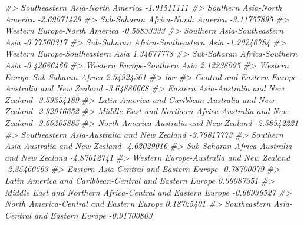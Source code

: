 \documentclass[
]{book}
\newenvironment{Shaded}{\begin{snugshade}}{\end{snugshade}}
\newcommand{\CommentTok}[1]{\textcolor[rgb]{0.56,0.35,0.01}{\textit{#1}}}
\theoremstyle{definition}
\theoremstyle{definition}
\theoremstyle{definition}
\theoremstyle{definition}
\theoremstyle{remark}
\begin{document}
\begin{Shaded}
\begin{Highlighting}[]
\CommentTok{\#\textgreater{} Southeastern Asia{-}North America                             {-}1.91511111}
\CommentTok{\#\textgreater{} Southern Asia{-}North America                                 {-}2.69071429}
\CommentTok{\#\textgreater{} Sub{-}Saharan Africa{-}North America                            {-}3.11757895}
\CommentTok{\#\textgreater{} Western Europe{-}North America                                {-}0.56833333}
\CommentTok{\#\textgreater{} Southern Asia{-}Southeastern Asia                             {-}0.77560317}
\CommentTok{\#\textgreater{} Sub{-}Saharan Africa{-}Southeastern Asia                        {-}1.20246784}
\CommentTok{\#\textgreater{} Western Europe{-}Southeastern Asia                             1.34677778}
\CommentTok{\#\textgreater{} Sub{-}Saharan Africa{-}Southern Asia                            {-}0.42686466}
\CommentTok{\#\textgreater{} Western Europe{-}Southern Asia                                 2.12238095}
\CommentTok{\#\textgreater{} Western Europe{-}Sub{-}Saharan Africa                            2.54924561}
\CommentTok{\#\textgreater{}                                                                     lwr}
\CommentTok{\#\textgreater{} Central and Eastern Europe{-}Australia and New Zealand        {-}3.64886668}
\CommentTok{\#\textgreater{} Eastern Asia{-}Australia and New Zealand                      {-}3.59354189}
\CommentTok{\#\textgreater{} Latin America and Caribbean{-}Australia and New Zealand       {-}2.92916652}
\CommentTok{\#\textgreater{} Middle East and Northern Africa{-}Australia and New Zealand   {-}3.66205885}
\CommentTok{\#\textgreater{} North America{-}Australia and New Zealand                     {-}2.38942221}
\CommentTok{\#\textgreater{} Southeastern Asia{-}Australia and New Zealand                 {-}3.79817773}
\CommentTok{\#\textgreater{} Southern Asia{-}Australia and New Zealand                     {-}4.62029016}
\CommentTok{\#\textgreater{} Sub{-}Saharan Africa{-}Australia and New Zealand                {-}4.87012741}
\CommentTok{\#\textgreater{} Western Europe{-}Australia and New Zealand                    {-}2.35460563}
\CommentTok{\#\textgreater{} Eastern Asia{-}Central and Eastern Europe                     {-}0.78700079}
\CommentTok{\#\textgreater{} Latin America and Caribbean{-}Central and Eastern Europe       0.09087351}
\CommentTok{\#\textgreater{} Middle East and Northern Africa{-}Central and Eastern Europe  {-}0.66936527}
\CommentTok{\#\textgreater{} North America{-}Central and Eastern Europe                     0.18725401}
\CommentTok{\#\textgreater{} Southeastern Asia{-}Central and Eastern Europe                {-}0.91700803}

\end{Highlighting}
\end{Shaded}
\end{document}
